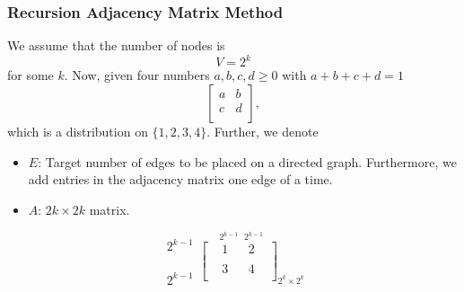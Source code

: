 \subsubsection{Recursion Adjacency Matrix Method}
We assume that the number of nodes is
\[
	V = 2^k
\]
for some \(k\). Now, given four numbers \(a, b, c, d \geq 0\) with \(a+b+c+d = 1\)
\[
	\begin{bmatrix}
		a & b \\
		c & d \\
	\end{bmatrix},
\]
which is a distribution on \(\{1, 2, 3, 4\}\). Further, we denote
\begin{itemize}
	\item \(E\): Target number of edges to be placed on a directed graph. Furthermore, we add entries in the adjacency matrix one edge of a time.
	\item \(A\): \(2k \times 2k\) matrix.
\end{itemize}
\[
	\substack{2^{k - 1}\\ \\ \\ \\ 2^{k-1}} \overset{\ \ \ 2^{k - 1}\ \ \ 2^{k-1}}{\begin{bmatrix}
			 & 1 &  & 2 & \\
			 &   &  &   & \\
			 & 3 &  & 4 & \\
		\end{bmatrix}}_{2^k\times 2^k}
\]

